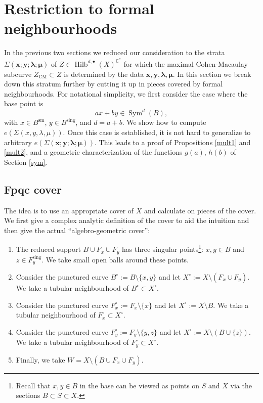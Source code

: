 \documentclass{amsart}
\theoremstyle{definition}
\newcommand{\CC} {\mathbb{C}}          %
\newcommand{\Sym}{\operatorname{Sym}}
\newcommand{\Hilb}{\operatorname{Hilb}}
\newcommand{\CM}{\operatorname{CM}}
\newcommand{\sm}{\operatorname{sm}}
\newcommand{\sing}{\operatorname{sing}}
\begin{document}
\section{Restriction to formal neighbourhoods} \label{formal}

In the previous two sections we reduced our consideration to the strata $\Sigma(\boldsymbol{x};\boldsymbol{y};\boldsymbol{\lambda};\boldsymbol{\mu})$ of $Z \in \Hilb^{d,\bullet}(X)^{\CC^*}$ for which the maximal Cohen-Macaulay subcurve $Z_{\CM} \subset Z$ is determined by the data $\boldsymbol{x}, \boldsymbol{y}, \boldsymbol{\lambda}, \boldsymbol{\mu}$. In this section we break down this stratum further by cutting it up in pieces covered by formal neighbourhoods. For notational simplicity, we first consider the case where the base point is 
$$
a x + b y \in \Sym^d(B),
$$
with $x \in B^{\sm}$, $y \in B^{\sing}$, and $d=a+b$. We show how to compute $e(\Sigma(x,y,\lambda,\mu))$. Once this case is established, it is not hard to generalize to arbitrary $e(\Sigma(\boldsymbol{x};\boldsymbol{y};\boldsymbol{\lambda};\boldsymbol{\mu}))$. This leads to a proof of Propositions \ref{mult1} and \ref{mult2}, and a geometric characterization of the functions $g(a)$, $h(b)$ of Section \ref{sym}.


\subsection{Fpqc cover}

The idea is to use an appropriate cover of $X$ and calculate on pieces of the cover. We first give a complex analytic definition of the cover to aid the intuition and then give the actual ``algebro-geometric cover'': 
\begin{enumerate}
\item The reduced support $B \cup F_x \cup F_y$ has three singular points\footnote{Recall that $x,y \in B$ in the base can be viewed as points on $S$ and $X$ via the sections $B \subset S \subset X$.}: $x,y \in B$ and $z \in F^{\sing}_{y}$. We take small open balls around these points.
\item Consider the punctured curve $B^\circ := B \setminus \{x,y\}$ and let $X^\circ := X \setminus (F_x  \cup F_y)$. We take a tubular neighbourhood of $B^\circ \subset X^\circ$.
\item Consider the punctured curve $F_{x}^{\circ} := F_x \setminus \{x\}$ and let $X^\circ := X \setminus B$. We take a tubular neighbourhood of $F_{x}^\circ \subset X^\circ$.
\item Consider the punctured curve $F_{y}^{\circ} := F_y \setminus \{y,z\}$ and let $X^\circ := X \setminus (B \cup \{z\})$. We take a tubular neighbourhood of $F_{y}^{\circ} \subset X^\circ$.
\item Finally, we take $W = X \setminus (B \cup F_x \cup F_y)$. 
\end{enumerate}
\end{document}
